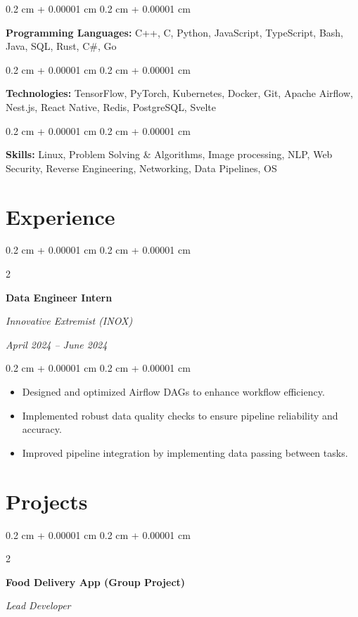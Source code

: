 \documentclass[10pt,letterpaper]{extarticle}
\newenvironment{highlights}{
    \begin{itemize}[
        topsep=0.10 cm,
        parsep=0.10 cm,
        partopsep=0pt,
        itemsep=0pt,
        leftmargin=0.4 cm + 10pt
    ]
}{
    \end{itemize}
} %
\newenvironment{onecolentry}{
    \begin{adjustwidth}{
        0.2 cm + 0.00001 cm
    }{
        0.2 cm + 0.00001 cm
    }
}{
    \end{adjustwidth}
} %
\newenvironment{twocolentry}[2][]{
    \onecolentry
    \def\secondColumn{#2}
    \setcolumnwidth{\fill, 5.0 cm}
    \begin{paracol}{2}
}{
    \switchcolumn \raggedleft \secondColumn
    \end{paracol}
    \endonecolentry
} %
\begin{document}
        \begin{onecolentry}
            \textbf{Programming Languages:} C++, C, Python, JavaScript, TypeScript, Bash, Java, SQL, Rust, C\#, Go
        \end{onecolentry}


        \begin{onecolentry}
            \textbf{Technologies:} TensorFlow, PyTorch, Kubernetes, Docker, Git, Apache Airflow, Nest.js, React Native, Redis, PostgreSQL, Svelte
        \end{onecolentry}


        \begin{onecolentry}
            \textbf{Skills:} Linux, Problem Solving \& Algorithms, Image processing, NLP, Web Security, Reverse Engineering, Networking, Data Pipelines, OS
        \end{onecolentry}

    \section{Experience}

        \begin{twocolentry}{
            \textit{April 2024 – June 2024}}
            \textbf{Data Engineer Intern}

            \textit{Innovative Extremist (INOX)}
        \end{twocolentry}

        \vspace{0.10 cm}
        \begin{onecolentry}
            \begin{highlights}
                \item Designed and optimized Airflow DAGs to enhance workflow efficiency.
                \item Implemented robust data quality checks to ensure pipeline reliability and accuracy.
                \item Improved pipeline integration by implementing data passing between tasks.
            \end{highlights}
        \end{onecolentry}
    
        \section{Projects}

        \begin{twocolentry}{
            \textit{Lead Developer}}
            \textbf{Food Delivery App (Group Project)}
        \end{twocolentry}
\end{document}
